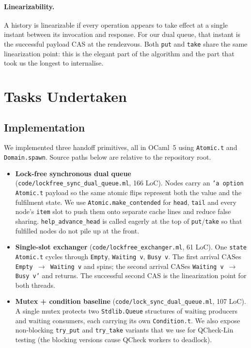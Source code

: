 \documentclass[11pt,a4paper]{article}
\begin{document}
\paragraph{Linearizability.}
A history is linearizable if every
operation appears to take effect at a single instant between its
invocation and response. For our dual queue, that instant is the
successful payload CAS at the rendezvous. Both \texttt{put} and
\texttt{take} share the same linearization point: this is the elegant
part of the algorithm and the part that took us the longest to
internalise.

\section{Tasks Undertaken}
\label{sec:tasks}

\subsection{Implementation}

We implemented three handoff primitives, all in OCaml~5 using
\texttt{Atomic.t} and \texttt{Domain.spawn}. Source paths below are
relative to the repository root.

\begin{itemize}[leftmargin=1.4em,itemsep=0.2em]
  \item \textbf{Lock-free synchronous dual queue}
    (\texttt{code/lockfree\_sync\_dual\_queue.ml}, 166 LoC). Nodes carry
    an \texttt{'a option Atomic.t} payload so the same atomic flips
    represent both the value and the fulfilment state. We use
    \texttt{Atomic.make\_contended} for \texttt{head}, \texttt{tail} and
    every node's \texttt{item} slot to push them onto separate cache
    lines and reduce false sharing. \texttt{help\_advance\_head} is
    called eagerly at the top of \texttt{put}/\texttt{take} so that
    fulfilled nodes do not pile up at the front.
  \item \textbf{Single-slot exchanger}
    (\texttt{code/lockfree\_exchanger.ml}, 61 LoC). One
    \texttt{state Atomic.t} cycles through \texttt{Empty}, \texttt{Waiting v},
    \texttt{Busy v}. The first arrival CASes \texttt{Empty $\to$ Waiting v}
    and spins; the second arrival CASes \texttt{Waiting v $\to$ Busy v'}
    and returns. The successful second CAS is the linearization point
    for both threads.
  \item \textbf{Mutex + condition baseline}
    (\texttt{code/lock\_sync\_dual\_queue.ml}, 107 LoC). A single mutex
    protects two \texttt{Stdlib.Queue} structures of waiting producers
    and waiting consumers, each carrying its own
    \texttt{Condition.t}. We also expose non-blocking \texttt{try\_put}
    and \texttt{try\_take} variants that we use for QCheck-Lin testing
    (the blocking versions cause QCheck workers to deadlock).
\end{itemize}
\end{document}

